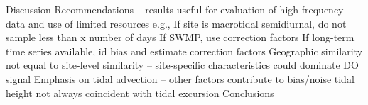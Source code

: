 \documentclass[letterpaper,12pt,oneside]{article}
\begin{document}
\begin{outline}
\1 Discussion
\2 Recommendations -- results useful for evaluation of high frequency data and use of limited resources
\3 e.g., If site is macrotidal semidiurnal, do not sample less than x number of days
\3 If SWMP, use correction factors
\3 If long-term time series available, id bias and estimate correction factors
\2 Geographic similarity not equal to site-level similarity -- site-specific characteristics could dominate DO signal
\2 Emphasis on tidal advection -- other factors contribute to bias/noise
\2 tidal height not always coincident with tidal excursion
\2 Conclusions

\end{outline}
\end{document}
